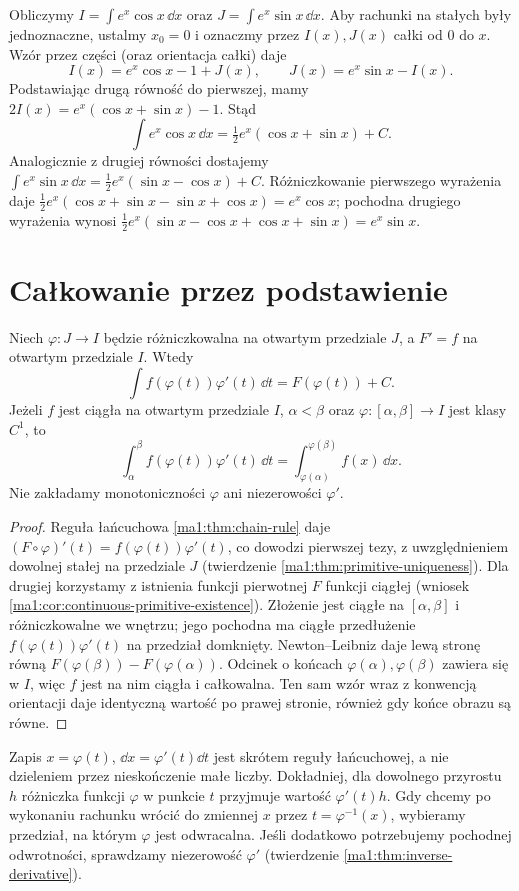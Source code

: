 \begin{przyklad}
\label{ma1:ex:parts-exp-trig}
Obliczymy $I=\int e^x\cos x\,\dd x$ oraz $J=\int e^x\sin x\,\dd x$. Aby rachunki na stałych były jednoznaczne, ustalmy $x_0=0$ i oznaczmy przez $I(x),J(x)$ całki od $0$ do $x$. Wzór przez części (oraz orientacja całki) daje
\[
 I(x)=e^x\cos x-1+J(x),\qquad
 J(x)=e^x\sin x-I(x).
\]
Podstawiając drugą równość do pierwszej, mamy $2I(x)=e^x(\cos x+\sin x)-1$. Stąd
\[
 \int e^x\cos x\,\dd x=\tfrac12 e^x(\cos x+\sin x)+C.
\]
Analogicznie z drugiej równości dostajemy
$\int e^x\sin x\,\dd x=\tfrac12e^x(\sin x-\cos x)+C$.
Różniczkowanie pierwszego wyrażenia daje $\tfrac12e^x(\cos x+\sin x-\sin x+\cos x)=e^x\cos x$; pochodna drugiego wyrażenia wynosi $\tfrac12e^x(\sin x-\cos x+\cos x+\sin x)=e^x\sin x$.
\end{przyklad}

\section{Całkowanie przez podstawienie}
\begin{twierdzenie}
\label{ma1:thm:integration-substitution}
Niech $\varphi:J\to I$ będzie różniczkowalna na otwartym przedziale $J$, a $F'=f$ na otwartym przedziale $I$. Wtedy
\[
 \int f(\varphi(t))\varphi'(t)\,\dd t=F(\varphi(t))+C.
\]
Jeżeli $f$ jest ciągła na otwartym przedziale $I$, $\alpha<\beta$ oraz $\varphi:[\alpha,\beta]\to I$ jest klasy $C^1$, to
\[
 \int_\alpha^\beta f(\varphi(t))\varphi'(t)\,\dd t
 =\int_{\varphi(\alpha)}^{\varphi(\beta)} f(x)\,\dd x.
\]
Nie zakładamy monotoniczności $\varphi$ ani niezerowości $\varphi'$.
\end{twierdzenie}
\begin{proof}
Reguła łańcuchowa \ref{ma1:thm:chain-rule} daje $(F\circ\varphi)'(t)=f(\varphi(t))\varphi'(t)$, co dowodzi pierwszej tezy, z uwzględnieniem dowolnej stałej na przedziale $J$ (twierdzenie \ref{ma1:thm:primitive-uniqueness}). Dla drugiej korzystamy z istnienia funkcji pierwotnej $F$ funkcji ciągłej (wniosek \ref{ma1:cor:continuous-primitive-existence}). Złożenie jest ciągłe na $[\alpha,\beta]$ i różniczkowalne we wnętrzu; jego pochodna ma ciągłe przedłużenie $f(\varphi(t))\varphi'(t)$ na przedział domknięty. Newton--Leibniz daje lewą stronę równą $F(\varphi(\beta))-F(\varphi(\alpha))$. Odcinek o końcach $\varphi(\alpha),\varphi(\beta)$ zawiera się w $I$, więc $f$ jest na nim ciągła i całkowalna. Ten sam wzór wraz z konwencją orientacji daje identyczną wartość po prawej stronie, również gdy końce obrazu są równe.
\end{proof}
Zapis $x=\varphi(t)$, $\dd x=\varphi'(t)\dd t$ jest skrótem reguły łańcuchowej, a nie dzieleniem przez nieskończenie małe liczby. Dokładniej, dla dowolnego przyrostu $h$ różniczka funkcji $\varphi$ w punkcie $t$ przyjmuje wartość $\varphi'(t)h$. Gdy chcemy po wykonaniu rachunku wrócić do zmiennej $x$ przez $t=\varphi^{-1}(x)$, wybieramy przedział, na którym $\varphi$ jest odwracalna. Jeśli dodatkowo potrzebujemy pochodnej odwrotności, sprawdzamy niezerowość $\varphi'$ (twierdzenie \ref{ma1:thm:inverse-derivative}).

